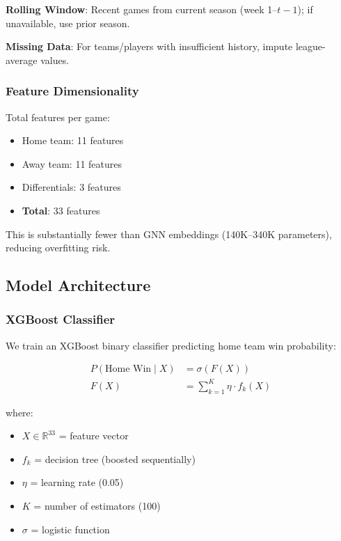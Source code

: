 \textbf{Rolling Window}: Recent games from current season (week 1--$t-1$); if unavailable, use prior season.

\textbf{Missing Data}: For teams/players with insufficient history, impute league-average values.

\subsubsection{Feature Dimensionality}

Total features per game:
\begin{itemize}
    \item Home team: 11 features
    \item Away team: 11 features
    \item Differentials: 3 features
    \item \textbf{Total}: 33 features
\end{itemize}

This is substantially fewer than GNN embeddings (140K--340K parameters), reducing overfitting risk.

\subsection{Model Architecture}

\subsubsection{XGBoost Classifier}

We train an XGBoost \citep{chen2016xgboost} binary classifier predicting home team win probability:

\begin{align*}
P(\text{Home Win} \mid X) &= \sigma(F(X)) \\
F(X) &= \sum_{k=1}^{K} \eta \cdot f_k(X)
\end{align*}

where:
\begin{itemize}
    \item $X \in \mathbb{R}^{33}$ = feature vector
    \item $f_k$ = decision tree (boosted sequentially)
    \item $\eta$ = learning rate (0.05)
    \item $K$ = number of estimators (100)
    \item $\sigma$ = logistic function
\end{itemize}

